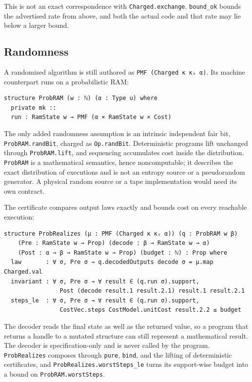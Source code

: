 \documentclass[acmsmall,nonacm]{acmart}
\begin{document}
This is not an exact correspondence with \lstinline{Charged.exchange}.
\lstinline{bound_ok} bounds the advertised rate from above, and both the actual code and that rate may lie below a larger bound.

\subsection{Randomness}\label{sec:probram}

A randomized algorithm is still authored as \lstinline{PMF (Charged κ κₛ α)}.
Its machine counterpart runs on a probabilistic RAM:

\begin{lstlisting}
structure ProbRAM (w : ℕ) (α : Type u) where
  private mk ::
  run : RamState w → PMF (α × RamState w × Cost)
\end{lstlisting}

The only added randomness assumption is an intrinsic independent fair bit, \lstinline{ProbRAM.randBit}, charged as \lstinline{Op.randBit}.
Deterministic programs lift unchanged through \lstinline{ProbRAM.lift}, and sequencing accumulates cost inside the distribution.
\lstinline{ProbRAM} is a mathematical semantics, hence noncomputable; it describes the exact distribution of executions and is not an entropy source or a pseudorandom generator.
A physical random source or a tape implementation would need its own contract.

The certificate compares output laws exactly and bounds cost on every reachable execution:

\begin{lstlisting}
structure ProbRealizes (μ : PMF (Charged κ κₛ α)) (q : ProbRAM w β)
    (Pre : RamState w → Prop) (decode : β → RamState w → α)
    (Post : α → β → RamState w → Prop) (budget : ℕ) : Prop where
  law       : ∀ σ, Pre σ → q.decodedOutputs decode σ = μ.map Charged.val
  invariant : ∀ σ, Pre σ → ∀ result ∈ (q.run σ).support,
                Post (decode result.1 result.2.1) result.1 result.2.1
  steps_le  : ∀ σ, Pre σ → ∀ result ∈ (q.run σ).support,
                CostVec.steps CostModel.unitCost result.2.2 ≤ budget
\end{lstlisting}

The decoder reads the final state as well as the returned value, so a program that returns a handle to a mutated structure can still represent a mathematical result.
The decoder is specification-only and is never called by the program.
\lstinline{ProbRealizes} composes through \lstinline{pure}, \lstinline{bind}, and the lifting of deterministic certificates, and \lstinline{ProbRealizes.worstSteps_le} turns its support-wise budget into a bound on \lstinline{ProbRAM.worstSteps}.
\end{document}
